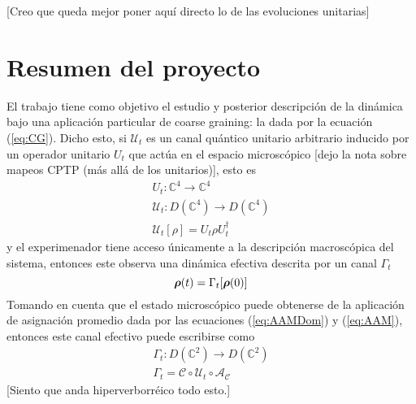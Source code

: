 \documentclass[onecolumn,11pt]{article}
\newcommand{\mcU}{\mathcal{U}}
\newcommand{\mcA}{\mathcal{A}}
\newcommand{\Cc}{\mathcal{C}} %
\newcommand{\Hh}{\mathbb{C}} %
\newcommand*{\B}[1]{\ifmmode\bm{#1}\else\textbf{#1}\fi}
\newcommand{\notaAd}[1]{{\color{blue} [#1]}} %
\begin{document}
\notaAd{Creo que queda mejor poner aquí directo lo de las evoluciones unitarias}
\vspace{0.5cm}
\section{Resumen del proyecto}

El trabajo tiene como objetivo el estudio y posterior descripción de la dinámica bajo una aplicación particular de coarse graining: la dada por la ecuación (\ref{eq:CG}). Dicho esto, si $\mcU_{t}$ es un canal quántico unitario arbitrario inducido por un operador unitario $U_{t}$ que actúa en el espacio microscópico\notaAd{dejo la nota sobre mapeos CPTP (más allá de los unitarios)}, esto es
\begin{gather}
U_{t}:\Hh^{4} \rightarrow \Hh^{4} \label{eq:UnitOpDyn}\\
\mcU_{t}:D(\Hh^{4})\rightarrow D(\Hh^{4}) \label{eq:UnitChaDyn}\\
\mcU_{t}[\rho]=U_{t}\rho U_{t}^{\dag}
\end{gather}
y el experimenador tiene acceso únicamente a la descripción macroscópica del sistema, entonces este observa una dinámica efectiva descrita por un canal $\Gamma_{t}$
\begin{equation}
\B{\rho}(t)=\Gamma_{t}[\B{\rho}(0)]
\end{equation}
Tomando en cuenta que el estado microscópico puede obtenerse de la aplicación de asignación promedio dada por las ecuaciones (\ref{eq:AAMDom}) y (\ref{eq:AAM}), entonces este canal efectivo puede escribirse como
\begin{gather}
\Gamma_{t}:D(\Hh^{2})\rightarrow D(\Hh^{2})\label{eq:GammaDom}\\
\Gamma_{t}=\Cc\circ\mcU_{t}\circ\mcA_{\Cc}\label{eq:Gamma}
\end{gather}
\notaAd{Siento que anda hiperverborréico todo esto.}
\end{document}
